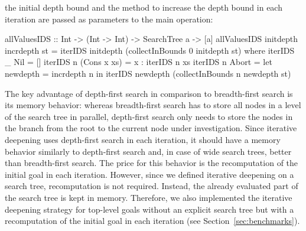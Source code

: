 \documentclass[english]{lni}
\begin{document}
the initial depth bound and the method to increase the depth bound
in each iteration are passed as parameters to the main operation:
%
\begin{curry}
allValuesIDS :: Int -> (Int -> Int) -> SearchTree a -> [a]
allValuesIDS initdepth incrdepth st =
  iterIDS initdepth (collectInBounds 0 initdepth st)
 where
  iterIDS _ Nil = []
  iterIDS n (Cons x xs) = x : iterIDS n xs
  iterIDS n Abort =
    let newdepth = incrdepth n
     in iterIDS newdepth (collectInBounds n newdepth st)
\end{curry}
%
The key advantage of depth-first search
in comparison to breadth-first search is its memory behavior:
whereas breadth-first search has to store all nodes
in a level of the search tree in parallel, depth-first search
only needs to store the nodes in the branch from the root
to the current node under investigation.
Since iterative deepening uses depth-first search in each iteration,
it should have a memory behavior similarly to depth-first search
and, in case of wide search trees,
better than breadth-first search.
The price for this behavior is the recomputation of the initial
goal in each iteration. 
However, since we defined iterative deepening on a search tree,
recomputation is not required. Instead, the
already evaluated part of the search tree is kept in memory.
Therefore, we also implemented the iterative deepening strategy
for top-level goals without an explicit search tree
but with a recomputation of the initial goal in each iteration
(see Section~\ref{sec:benchmarks}).
\end{document}

